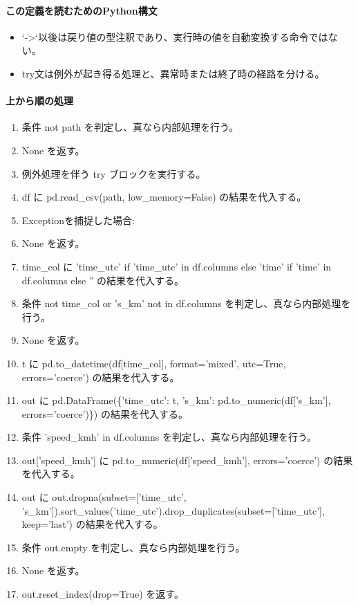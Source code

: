 \documentclass[a4paper,11pt]{article}
\begin{document}
            \paragraph{この定義を読むためのPython構文}
            \begin{itemize}[leftmargin=1.6em]
            \item `->`以後は戻り値の型注釈であり、実行時の値を自動変換する命令ではない。
\item try文は例外が起き得る処理と、異常時または終了時の経路を分ける。
            \end{itemize}
            \paragraph{上から順の処理}
            \begin{enumerate}[leftmargin=1.8em]
            \item 条件 not path を判定し、真なら内部処理を行う。
\item   None を返す。
\item 例外処理を伴う try ブロックを実行する。
\item   df に pd.read\_csv(path, low\_memory=False) の結果を代入する。
\item   Exceptionを捕捉した場合:
\item   None を返す。
\item time\_col に 'time\_utc' if 'time\_utc' in df.columns else 'time' if 'time' in df.columns else '' の結果を代入する。
\item 条件 not time\_col or 's\_km' not in df.columns を判定し、真なら内部処理を行う。
\item   None を返す。
\item t に pd.to\_datetime(df[time\_col], format='mixed', utc=True, errors='coerce') の結果を代入する。
\item out に pd.DataFrame(\{'time\_utc': t, 's\_km': pd.to\_numeric(df['s\_km'], errors='coerce')\}) の結果を代入する。
\item 条件 'speed\_kmh' in df.columns を判定し、真なら内部処理を行う。
\item   out['speed\_kmh'] に pd.to\_numeric(df['speed\_kmh'], errors='coerce') の結果を代入する。
\item out に out.dropna(subset=['time\_utc', 's\_km']).sort\_values('time\_utc').drop\_duplicates(subset=['time\_utc'], keep='last') の結果を代入する。
\item 条件 out.empty を判定し、真なら内部処理を行う。
\item   None を返す。
\item out.reset\_index(drop=True) を返す。
            \end{enumerate}
\end{document}
